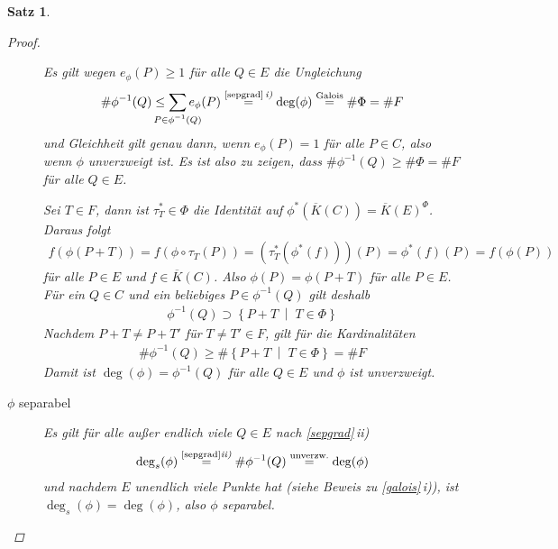 \documentclass[english, german, parskip=half]{scrartcl}
\newtheorem{Satz}{Satz}[section]
\theoremstyle{definition}
\theoremstyle{remark}
\newcommand*{\algK}{\ensuremath{\overline K}} %
\newcommand*{\degs}{\operatorname{\deg}_s} %
\newcommand{\F}{F} %
\begin{document}
\begin{Satz}
\begin{proof}
\begin{description}
      Es gilt wegen $e_\phi(P)\geq1$ für alle $Q\in E$ die Ungleichung
      \begin{gather*}
        \#\phi^{-1}(Q)
        \leq
        \sum_{\mathclap{P\in\phi^{-1}(Q)}} e_\phi(P)
        \overset{\text{\autoref{sepgrad}\,\emph{i)}}}{=}
        \deg(\phi)
        \overset{\text{Galois}}{=}
        \#\Phi
        =\# \F
      \end{gather*}
      und Gleichheit gilt genau dann, wenn $e_\phi(P)=1$ für alle
      $P\in C$, also wenn $\phi$ unverzweigt ist.
      Es ist also zu zeigen, dass $\#\phi^{-1}(Q)\geq\#\Phi=\# \F$ für alle 
      $Q\in E$.

      Sei $T\in\F$, dann ist $\tau_T^*\in\Phi$ die Identität auf
      $\phi^*(\algK(C))=\algK(E)^\Phi$. Daraus folgt
      \begin{gather*}
        f(\phi(P+T))
        = f(\phi\circ\tau_T(P)) 
        = \left( \tau_T^*(\phi^*(f)) \right)(P)
        = \phi^*(f)(P)
        = f(\phi(P))
      \end{gather*}
      für alle $P\in E$ und $f\in\algK(C)$.
      Also $\phi(P) = \phi(P+T)$ für alle $P\in E$.
      Für ein $Q\in C$ und ein beliebiges $P\in\phi^{-1}(Q)$ gilt
      deshalb
      \begin{gather*}
        \phi^{-1}(Q) 
        \supset \left\{ P+T \;\middle|\; T\in\Phi \right\}        
      \end{gather*}
      Nachdem $P+T\neq P+T'$ für $T\neq T'\in\F$, gilt für die
      Kardinalitäten
      \begin{gather*}
        \#\phi^{-1}(Q) 
        \geq \#\left\{ P+T \;\middle|\; T\in\Phi \right\}
        = \#\F
      \end{gather*}
      Damit ist $\deg(\phi)=\phi^{-1}(Q)$ für alle $Q\in E$ und
      $\phi$ ist unverzweigt.

    \item[$\phi$ separabel]
      Es gilt für alle außer endlich viele $Q\in E$ nach
      \autoref{sepgrad}\,\emph{ii)}
      \begin{gather*}
        \degs(\phi) 
        \overset{\text{\autoref{sepgrad}\emph{ii)}}}{=}
        \#\phi^{-1}(Q) 
        \overset{\text{unverzw.}}{=} 
          \deg(\phi)
      \end{gather*}
      und nachdem $E$ unendlich viele Punkte hat (siehe Beweis zu
      \autoref{galois}\,\emph{i)}), ist $\degs(\phi)=\deg(\phi)$, also
      $\phi$ separabel.
    \end{description}
    

\end{proof}
\end{Satz}
\end{document}
